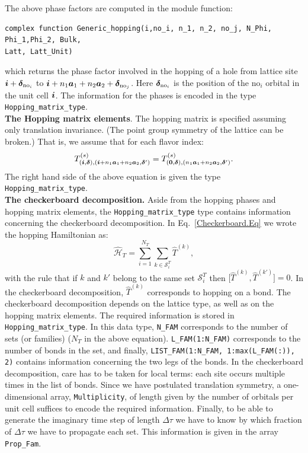 The above phase factors are computed  in the   module function: 
\begin{lstlisting}[style=fortran]
complex function Generic_hopping(i,no_i, n_1, n_2, no_j, N_Phi, Phi_1,Phi_2, Bulk, 
Latt, Latt_Unit)
\end{lstlisting}
which returns the  phase factor involved in the hopping of a hole from lattice site $ \boldsymbol{i} + \boldsymbol{\delta}_{\text{no}_i} $ to 
$\boldsymbol{i} + n_1 \boldsymbol{a}_1 + n_2 \boldsymbol{a}_2+ \boldsymbol{\delta}_{\text{no}_j}  $.  Here  $\boldsymbol{\delta}_{\text{no}_i}$  is  the position of the $\text{no}_i$  orbital in the unit cell
$\boldsymbol{i}$. 
The information for the phases is encoded in the type \texttt{Hopping\_matrix\_type}.\\

\noindent
\textbf{The  Hopping matrix elements}. 
The hopping matrix  is specified assuming only translation invariance.  (The point group symmetry of the lattice can be broken.)
That is, we assume that  for  each flavor index:
\begin{equation} 
T_{(\boldsymbol{i},\boldsymbol{\delta}), (\boldsymbol{i} +  n_1\boldsymbol{a}_1  + n_2 \boldsymbol{a}_2,\boldsymbol{\delta}')}^{(s)}   =   T^{(s)}_{(\boldsymbol{0},\boldsymbol{\delta}),  (n_1\boldsymbol{a}_1  + n_2 \boldsymbol{a}_2,\boldsymbol{\delta}') }.
\label{eq:hop}	 
\end{equation}
The right  hand side of the above equation is given  the type  \texttt{Hopping\_matrix\_type}.\\


\noindent
\textbf{The checkerboard decomposition.}   Aside from the hopping phases and hopping matrix elements, the \texttt{Hopping\_matrix\_type} type contains information  concerning the checkerboard   decomposition.  In Eq.~\eqref{Checkerboard.Eq} we wrote the hopping Hamiltonian as:
\begin{equation}
\hat{\mathcal{H}}_{T}     = \sum_{i=1}^{N_T} \sum_{k \in \mathcal{S}^{T}_i} \hat{T}^{(k)},  
\end{equation}
with the rule that  if $k$ and $k'$  belong to the same set $\mathcal{S}^{T}_i $ then   $ \big[ \hat{T}^{(k)} , \hat{T}^{(k')} \big] = 0 $.  In the checkerboard decomposition, $\hat{T}^{(k)}$   corresponds to  hopping on a bond.    The checkerboard decomposition depends on the   lattice type, as well as on the hopping matrix elements.   The required  information is stored in  \texttt{Hopping\_matrix\_type}. In this data type,  \texttt{N\_FAM}  corresponds to the number of sets  (or families) ($N_T$ in the above equation). \texttt{L\_FAM(1:N\_FAM)}   corresponds to the number of bonds in the set,  and finally,  \texttt{LIST\_FAM(1:N\_FAM, 1:max(L\_FAM(:)), 2)}    contains  information concerning the two legs of the bonds.    In the checkerboard decomposition, care has to be taken for local terms: each site  occurs multiple times in the list of bonds.    Since we have postulated translation symmetry,    a one-dimensional array, \texttt{Multiplicity},  of length  given by  the number of orbitals per unit cell suffices to  encode the required information.  
Finally, to be able to generate  the imaginary time step of length $\Delta \tau$  we  have to know   by which fraction of  $\Delta \tau$   we have to propagate each set.  This information is given in  the array  \texttt{Prop\_Fam}.  

